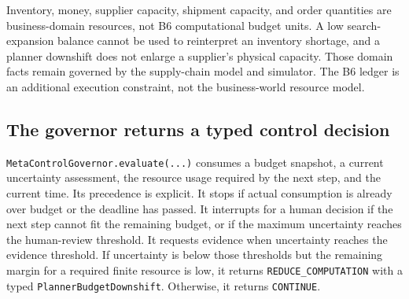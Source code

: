 Inventory, money, supplier capacity, shipment capacity, and order quantities are business-domain resources, not B6 computational budget units. A low search-expansion balance cannot be used to reinterpret an inventory shortage, and a planner downshift does not enlarge a supplier's physical capacity. Those domain facts remain governed by the supply-chain model and simulator. The B6 ledger is an additional execution constraint, not the business-world resource model.

\subsection{The governor returns a typed control decision}
\label{subsec:ch23-meta-control-governor}
\Needspace{0.88\textheight}

\texttt{MetaControlGovernor.evaluate(...)} consumes a budget snapshot, a current uncertainty assessment, the resource usage required by the next step, and the current time. Its precedence is explicit. It stops if actual consumption is already over budget or the deadline has passed. It interrupts for a human decision if the next step cannot fit the remaining budget, or if the maximum uncertainty reaches the human-review threshold. It requests evidence when uncertainty reaches the evidence threshold. If uncertainty is below those thresholds but the remaining margin for a required finite resource is low, it returns \texttt{REDUCE\_COMPUTATION} with a typed \texttt{PlannerBudgetDownshift}. Otherwise, it returns \texttt{CONTINUE}.

